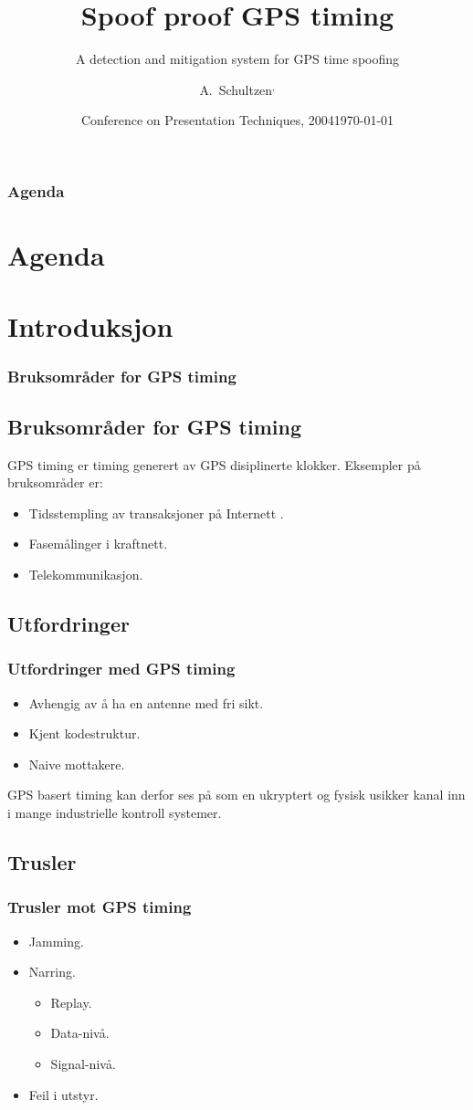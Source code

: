 \documentclass[xcolor=table]{beamer}
\title[Spoof proof GPS timing] %
{Spoof proof GPS timing}
\subtitle{A detection and mitigation system for GPS time spoofing}
\author[A. Schultzen] %
{A.~Schultzen\inst{1}$^{,}$\inst{3}}
\institute[Universities Here and There] %
{
  \inst{1}%
  Department of Informatics\\
  University of Oslo
  \and
  \inst{3}
  UNIK\\
  University Graduate Center
}
\date[KPT 2004] %
{Conference on Presentation Techniques, 2004}
\date{\today}
\begin{document}
\frame{\titlepage}
\begin{frame}
\frametitle{Agenda}
\section *{Agenda}
\tableofcontents
\end{frame}

\section{Introduksjon}
\begin{frame}
\frametitle{Bruksområder for GPS timing}
	\subsection{Bruksområder for GPS timing}
  GPS timing er timing generert av GPS disiplinerte klokker. Eksempler på bruksområder er:
  \begin{itemize}
    \item Tidsstempling av transaksjoner på Internett .
    \item Fasemålinger i kraftnett.
    \item Telekommunikasjon.
  \end{itemize}
\end{frame}

\subsection{Utfordringer}
\begin{frame}
\frametitle{Utfordringer med GPS timing}
  \begin{itemize}
    \item Avhengig av å ha en antenne med fri sikt.
    \item Kjent kodestruktur.
    \item Naive mottakere.
  \end{itemize}
  GPS basert timing kan derfor ses på som en ukryptert og fysisk usikker kanal inn i mange industrielle kontroll systemer.
\end{frame}

\subsection{Trusler}
\begin{frame}
  \frametitle{Trusler mot GPS timing}
  \begin{itemize}
    \item Jamming. 
    \item Narring.
    \begin{itemize}
      \item Replay.
      \item Data-nivå. 
      \item Signal-nivå.
    \end{itemize}
    \item Feil i utstyr.
  \end{itemize}    
\end{frame}
\end{document}
